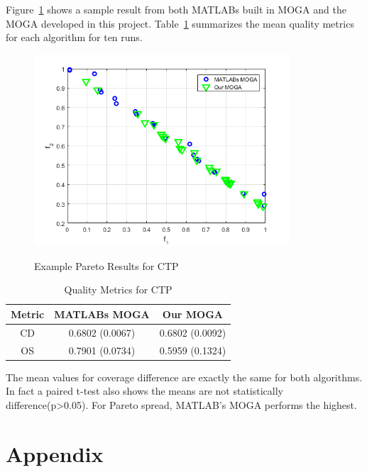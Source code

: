 \documentclass{article}
\begin{document}
Figure~\ref{fig:CTP} shows a sample result from both MATLABs built in MOGA and the MOGA developed in this project. Table~\ref{tab:CTP} summarizes the mean quality metrics for each algorithm for ten runs.
\begin{figure}[h]
  \caption{Example Pareto Results for CTP}
  \centering
  \includegraphics[width=0.85\textwidth]{CTP_pareto_final.png}  
  \label{fig:CTP}
\end{figure}

\begin{table}[h]
\caption{Quality Metrics for CTP} 
\centering 
\begin{tabular}{|c|c|c|} 
\hline\hline  
Metric & MATLABs MOGA & Our MOGA \\ \hline
CD & 0.6802 (0.0067) &  0.6802 (0.0092) \\ \hline
OS & 0.7901 (0.0734) & 0.5959 (0.1324) \\ \hline
\end{tabular}
\label{tab:CTP} 
\end{table} 
 
The mean values for coverage difference are exactly the same for both algorithms. In fact a paired t-test also shows the means are not statistically difference(p>0.05). For Pareto spread, MATLAB's MOGA performs the highest.
 
 
 \newpage
\vspace{-0.1in}


 
 

\section{Appendix}
\end{document}

